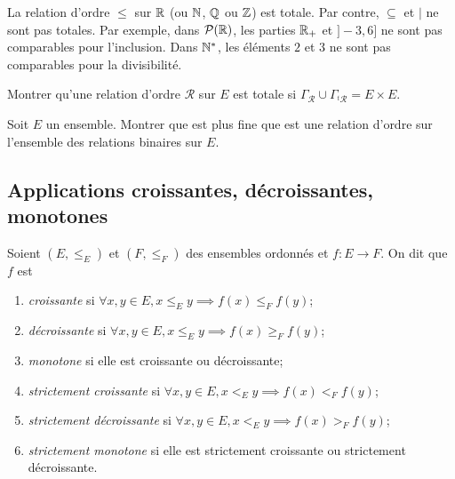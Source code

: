 \begin{exemples}
La relation d'ordre $\leq$ sur $\mathbb{R}$ (ou $\mathbb{N}$, $\mathbb{Q}$ ou  $\mathbb{Z}$) est totale. Par contre, $\subseteq$ et $|$ ne sont pas totales. Par exemple, dans $\mathcal P(\mathbb{R})$, les parties $\mathbb{R}_+$ et $]-3,6]$ ne sont pas comparables pour l'inclusion. Dans $\mathbb{N}^*$, les éléments $2$ et $3$ ne sont pas comparables pour la divisibilité.
\end{exemples}



\begin{exercice}
Montrer qu'une relation d'ordre $\mathcal R$ sur $E$ est totale si $\Gamma_\mathcal R \cup \Gamma_{{}^t\mathcal R} = E\times E$.
\end{exercice}



\begin{exercice}
Soit $E$ un ensemble. Montrer que \og est plus fine que\fg{} est une relation d'ordre sur l'ensemble des relations binaires sur $E$.
\end{exercice}


\subsection{Applications croissantes, décroissantes, monotones}


\begin{definition}
Soient $(E,\leq_E)$ et $(F,\leq_F)$ des ensembles ordonnés et $f : E\to F$. On dit que $f$ est 
\begin{enumerate}
\item \emph{croissante} si $\forall x, y\in E, x\leq_E y \implies f(x) \leq_F f(y)$;
\item \emph{décroissante} si $\forall x, y\in E, x\leq_E y \implies f(x) \geq_F f(y)$;
\item \emph{monotone} si elle est croissante ou décroissante;
\item \emph{strictement croissante} si $\forall x, y\in E, x<_E y \implies f(x) <_F f(y)$;
\item \emph{strictement décroissante} si $\forall x, y\in E, x<_E y \implies f(x) >_F f(y)$;
\item \emph{strictement monotone} si elle est strictement croissante ou strictement décroissante.
\end{enumerate}
\end{definition}


